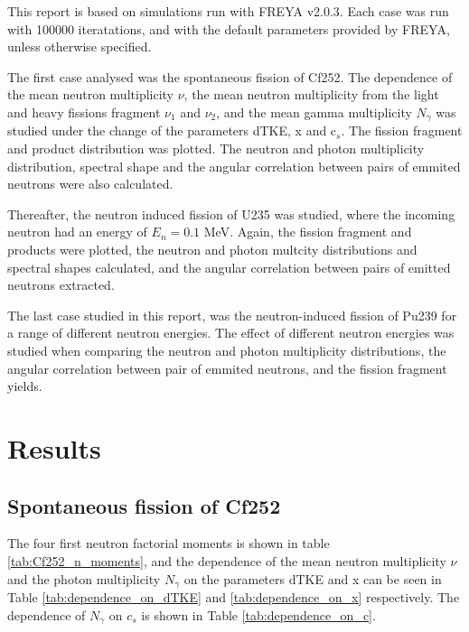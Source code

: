\documentclass[]{article}
\begin{document}
This report is based on simulations run with FREYA v2.0.3. Each case was run with 100000 iteratations, and with the default parameters provided by FREYA, unless otherwise specified. 

The first case analysed was the spontaneous fission of Cf252. The dependence of the mean neutron multiplicity $\nu$, the mean neutron multiplicity from the light  and heavy fissions fragment $\nu_1$ and $\nu_2$, and the mean gamma multiplicity $N_{\gamma}$ was studied under the change of the parameters dTKE, x and c$_s$. The fission fragment and product distribution was plotted. The neutron and photon multiplicity distribution, spectral shape and the angular correlation between pairs of emmited neutrons were also calculated.

\par 
\vspace{3mm}

Thereafter, the neutron induced fission of U235 was studied, where the incoming neutron had an energy of $E_n = 0.1 $ MeV. Again, the fission fragment and products were plotted, the neutron and photon multcity distributions and spectral shapes calculated, and the angular correlation between pairs of emitted neutrons extracted. 

\par 
\vspace{3mm}
The last case studied in this report, was the neutron-induced fission of Pu239 for a range of different neutron energies. The effect of different neutron energies was studied when comparing the neutron and photon multiplicity distributions, the angular correlation between pair of emmited neutrons, and the fission fragment yields. 

\section{Results}
\label{Results}

\subsection{Spontaneous fission of Cf252 }

The four first neutron factorial moments is shown in table \ref{tab:Cf252_n_moments}, and the dependence of the mean neutron multiplicity $\nu$ and the photon multiplicity $N_{\gamma}$ on the parameters dTKE and x  can be seen in Table \ref{tab:dependence_on_dTKE} and \ref{tab:dependence_on_x} respectively. The dependence of $N_{\gamma}$ on $c_s$ is shown in Table \ref{tab:dependence_on_c}.
\end{document}
